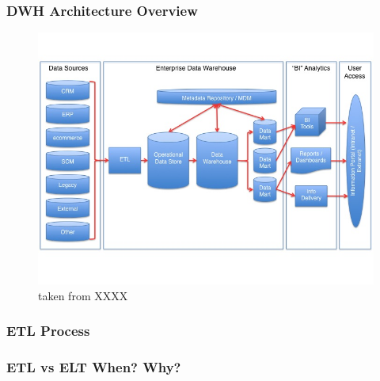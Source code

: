 \begin{frame}
\frametitle{DWH Architecture Overview}
\begin{figure}[ht]
	
	\centering
	\includegraphics[width=.9\linewidth,height=.8\textheight]{./Figures/chapter-01/Datawarehouse_reference_architecture.jpg}
	\caption{taken from XXXX}
\end{figure}
\end{frame}


\subsubsection{ETL Process}
\subsubsection{ETL vs ELT When? Why?}

